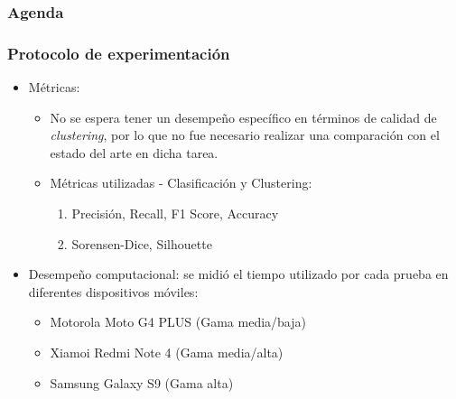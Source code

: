 \watermarkon
\begin{frame}
\frametitle{Agenda}

\end{frame}
\watermarkoff

\begin{frame}[t,fragile]
\frametitle {Protocolo de experimentación}
\begin{itemize}
	\item Métricas:
	\begin{itemize}
		\item No se espera tener un desempeño específico en términos de calidad de \textit{clustering}, por lo que no fue necesario realizar una comparación con el estado del arte en dicha tarea.
		\vspace{2mm}
		\item Métricas utilizadas - \color{red} Clasificación \color{black}y \color{blue} Clustering:
		\vspace{2mm}
		\begin{enumerate}
			\item \color{red} Precisión, Recall, F1 Score, Accuracy
			\item \color{blue} Sorensen-Dice, Silhouette 
		\end{enumerate}
	\end{itemize}
	\vspace{3mm}
	\item Desempeño computacional: se midió el tiempo utilizado por cada prueba en diferentes dispositivos móviles:
	\begin{itemize}
		\item Motorola Moto G4 PLUS (Gama media/baja)
		\vspace{2mm}
		\item Xiamoi Redmi Note 4 (Gama media/alta)
		\vspace{2mm}
		\item Samsung Galaxy S9 (Gama alta)
	\end{itemize}
\end{itemize}
\end{frame}
